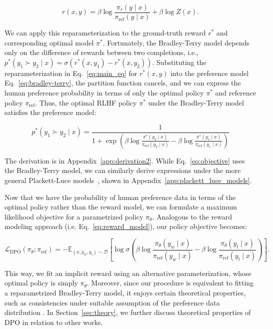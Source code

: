 \begin{equation}\label{eq:main_eq}
    r(x,y) =\beta \log \frac{\pi_r(y\mid x)}{\pi_\text{ref}(y\mid x)} + \beta \log Z(x).
\end{equation}

We can apply this reparameterization to the ground-truth reward $r^*$ and corresponding optimal model $\pi^*$. Fortunately, the Bradley-Terry model depends only on the difference of rewards between two completions, i.e., ${p^*(y_1 \succ y_2 \mid x) = \sigma(r^*(x, y_1) - r^*(x, y_2))}$. Substituting the reparameterization in Eq.~\ref{eq:main_eq} for $r^*(x,y)$ into the preference model Eq.~\ref{eq:bradley-terry}, the partition function cancels, and we can express the human preference probability in terms of only the optimal policy $\pi^*$ and reference policy $\pi_\text{ref}$. Thus, the optimal RLHF policy $\pi^*$ under the Bradley-Terry model satisfies the preference model:

\begin{equation}\label{eq:objective}
    p^*(y_1\succ y_2 \mid x)=\frac{1}{1 + \exp\left(\beta \log \frac{\pi^*(y_2\mid x)}{\pi_\text{ref}(y_2\mid x)} - \beta \log \frac{\pi^*(y_1\mid x)}{\pi_\text{ref}(y_1\mid x)}\right)}
\end{equation}

The derivation is in Appendix~\ref{app:derivation2}. While Eq.~\ref{eq:objective} uses the Bradley-Terry model, we can similarly derive expressions under the more general Plackett-Luce models~\citep{plackett1975analysis, luce2012individual}, shown in Appendix~\ref{app:plackett_luce_models}.

Now that we have the probability of human preference data in terms of the optimal policy rather than the reward model, we can formulate a maximum likelihood objective for a parametrized policy $\pi_\theta$. Analogous to the reward modeling approach (i.e. Eq.~\ref{eq:reward_model}), our policy objective becomes:

\begin{equation}\label{eq:optimum_model}
    \mathcal{L}_\text{DPO}(\pi_{\theta}; \pi_\text{ref}) = -\mathbb{E}_{(x, y_w, y_l)\sim \mathcal{D}}\left[\log \sigma \left(\beta \log \frac{\pi_{\theta}(y_w\mid x)}{\pi_\text{ref}(y_w\mid x)} - \beta \log \frac{\pi_{\theta}(y_l\mid x)}{\pi_\text{ref}(y_l\mid x)}\right)\right].
\end{equation}

This way, we fit an implicit reward using an alternative parameterization, whose optimal policy is simply $\pi_\theta$. Moreover, since our procedure is equivalent to fitting a reparametrized Bradley-Terry model, it enjoys certain theoretical properties, such as consistencies under suitable assumption of the preference data distribution \cite{bong2022generalized}. In Section~\ref{sec:theory}, we further discuss theoretical properties of DPO in relation to other works.

